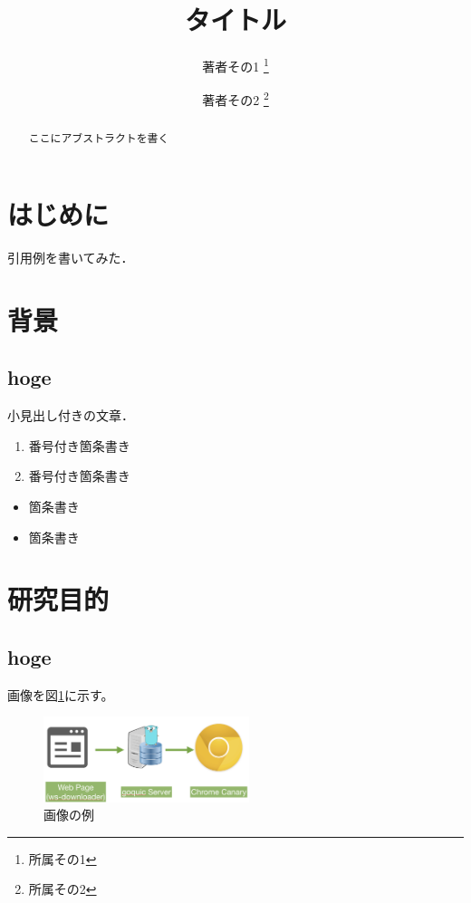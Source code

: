 \documentclass[a4j,10pt]{jsarticle}
\begin{document}

\title{タイトル}

\author{
    著者その1 \thanks{所属その1}
    \and
    著者その2 \thanks{所属その2}
}

\begin{abstract}
ここにアブストラクトを書く
\end{abstract}

\maketitle
\thispagestyle{empty}

\section{はじめに}

引用例\cite{example}を書いてみた．

\section{背景}

\subsection{hoge}
小見出し付きの文章．

\begin{enumerate}
\item 番号付き箇条書き
\item 番号付き箇条書き
\end{enumerate}

\begin{itemize}
\item 箇条書き
\item 箇条書き
\end{itemize}


\section{研究目的}

\subsection{hoge}
画像を図\ref{sample}に示す。

\begin{figure}[htbp]
    \begin{center}
        \includegraphics[width=6cm]{figure1.png}
        \caption{画像の例}
        \label{sample}
    \end{center}
\end{figure}
\end{document}

